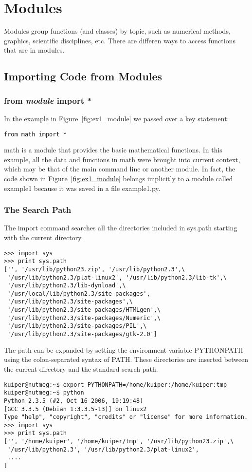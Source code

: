 \documentclass{article}
\begin{document}
\section{Modules}

Modules group functions (and classes) by topic, such as numerical methods,
graphics, scientific disciplines, etc.  There are differen ways to access
functions that are in modules.

\subsection{Importing Code from Modules}

\subsubsection{{\ttfamily from {\itshape module} import *}}

In the example in Figure~\ref{fig:ex1_module} we passed over a key statement:
\begin{verbatim}
from math import *
\end{verbatim}
{\ttfamily math} is a module that provides the basic mathematical functions.
In this example, all the data and functions in {\ttfamily math} were brought into
current context, which may be that of the main command line or another module.
In fact, the code shown in Figure~\ref{fig:ex1_module} belongs implicitly to a
module called {\ttfamily example1} because it was saved in a file 
{\ttfamily example1.py}.

\subsubsection{The Search Path}

The {\ttfamily import} command searches all the directories
included in {\ttfamily sys.path} starting with the current directory.
\begin{verbatim}
>>> import sys
>>> print sys.path
['', '/usr/lib/python23.zip', '/usr/lib/python2.3',\
 '/usr/lib/python2.3/plat-linux2', '/usr/lib/python2.3/lib-tk',\
 '/usr/lib/python2.3/lib-dynload',\
 '/usr/local/lib/python2.3/site-packages',
 '/usr/lib/python2.3/site-packages',\
 '/usr/lib/python2.3/site-packages/HTMLgen',\
 '/usr/lib/python2.3/site-packages/Numeric',\
 '/usr/lib/python2.3/site-packages/PIL',\
 '/usr/lib/python2.3/site-packages/gtk-2.0']
\end{verbatim}
The path can be expanded by setting the environment variable {\ttfamily PYTHONPATH}
using the colon-separated syntax of {\ttfamily PATH}. These directories are
inserted between the current directory and the standard search path.
\begin{verbatim}
kuiper@nutmeg:~$ export PYTHONPATH=/home/kuiper:/home/kuiper:tmp
kuiper@nutmeg:~$ python
Python 2.3.5 (#2, Oct 16 2006, 19:19:48)
[GCC 3.3.5 (Debian 1:3.3.5-13)] on linux2
Type "help", "copyright", "credits" or "license" for more information.
>>> import sys
>>> print sys.path
['', '/home/kuiper', '/home/kuiper/tmp', '/usr/lib/python23.zip',\
 '/usr/lib/python2.3', '/usr/lib/python2.3/plat-linux2',
 ....
]
\end{verbatim}
\end{document}
